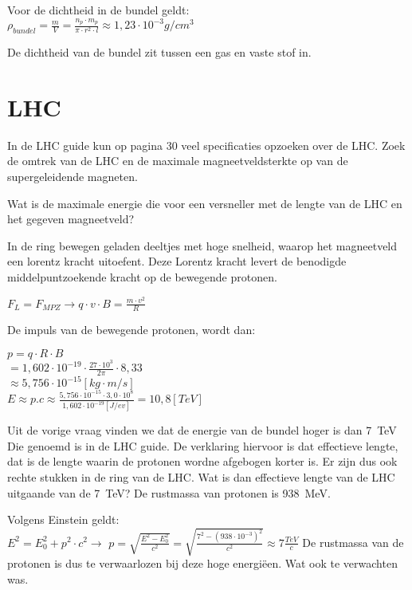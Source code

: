 \begin{questions}
Voor de dichtheid in de bundel geldt:\\

$\rho_{bundel} = \frac{m}{V} = \frac{n_{p} \cdot m_{p}}{\pi \cdot r^2 \cdot l} \approx 1,23 \cdot 10^{-3} g/cm^{3}$


De dichtheid van de bundel zit tussen een gas en vaste stof in.

\section{LHC}

In de LHC guide kun op pagina 30 veel specificaties opzoeken over de LHC.
\question
Zoek de omtrek van de LHC en de maximale magneetveldsterkte op van de 
supergeleidende magneten.

\question 
Wat is de maximale energie die voor een versneller met de lengte van de LHC en
het gegeven magneetveld? 

In de ring bewegen geladen deeltjes met hoge snelheid, waarop het magneetveld
een lorentz kracht uitoefent. Deze Lorentz kracht levert de benodigde middelpuntzoekende
kracht op de bewegende protonen.

$F_L = F_{MPZ} \rightarrow q \cdot v \cdot B = \frac{m \cdot v^2}{R}$

De impuls van de bewegende protonen, wordt dan:


$ p = q \cdot R \cdot B $ \\
$   = 1,602 \cdot 10^{-19} \cdot \frac{27\cdot 10^3}{2\pi} \cdot 8,33 $ \\
$ \approx 5,756 \cdot 10^{-15} [kg\cdot m/s]$ \\
$ E \approx p.c \approx \frac{5,756 \cdot 10^{-15} \cdot 3,0 \cdot 10^8}{1,602 \cdot 10^{-19} [J/ev]} = 10,8 [TeV]$

 

\question
Uit de vorige vraag vinden we dat de energie van de bundel hoger is dan \SI{7}{\tera\electronvolt}
Die genoemd is in de LHC guide. De verklaring hiervoor is dat effectieve lengte, dat is de lengte waarin de protonen wordne 
afgebogen korter is. Er zijn dus ook rechte stukken in de ring van de LHC.
Wat is dan effectieve lengte van de LHC uitgaande van de
\SI{7}{\tera\electronvolt}? De rustmassa van protonen is \SI{938}{\mega\electronvolt}.

Volgens Einstein geldt:\\
$E^2 = E_0^2 + p^2 \cdot c^2 \rightarrow $
$p = \sqrt{\frac{E^2 -E_0^2}{c^2}} = \sqrt{\frac{7^2 -(938 \cdot 10^{-3})^2}{c^2}} \approx 7\frac{TeV}{c}$
De rustmassa van de protonen is dus te verwaarlozen bij deze hoge energiëen. 
Wat ook te verwachten was. 








\end{questions}
